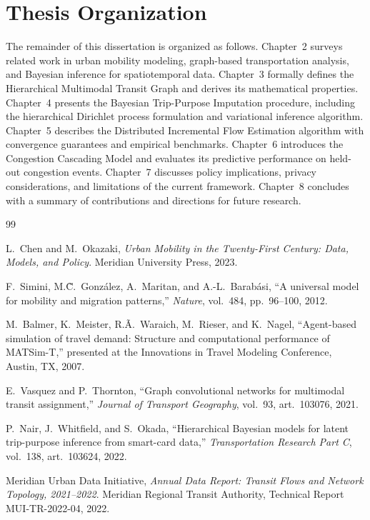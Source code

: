 \section{Thesis Organization}

The remainder of this dissertation is organized as follows. Chapter~2 surveys related work in urban mobility modeling, graph-based transportation analysis, and Bayesian inference for spatiotemporal data. Chapter~3 formally defines the Hierarchical Multimodal Transit Graph and derives its mathematical properties. Chapter~4 presents the Bayesian Trip-Purpose Imputation procedure, including the hierarchical Dirichlet process formulation and variational inference algorithm. Chapter~5 describes the Distributed Incremental Flow Estimation algorithm with convergence guarantees and empirical benchmarks. Chapter~6 introduces the Congestion Cascading Model and evaluates its predictive performance on held-out congestion events. Chapter~7 discusses policy implications, privacy considerations, and limitations of the current framework. Chapter~8 concludes with a summary of contributions and directions for future research.

\begin{thebibliography}{99}

L.\ Chen and M.\ Okazaki,
\emph{Urban Mobility in the Twenty-First Century: Data, Models, and Policy}.
Meridian University Press, 2023.

F.\ Simini, M.\~C.\ Gonz\'{a}lez, A.\ Maritan, and A.-L.\ Barab\'{a}si,
``A universal model for mobility and migration patterns,''
\emph{Nature}, vol.\ 484, pp.\ 96--100, 2012.

M.\ Balmer, K.\ Meister, R.\~A.\ Waraich, M.\ Rieser, and K.\ Nagel,
``Agent-based simulation of travel demand: Structure and computational performance of MATSim-T,''
presented at the Innovations in Travel Modeling Conference, Austin, TX, 2007.

E.\ Vasquez and P.\ Thornton,
``Graph convolutional networks for multimodal transit assignment,''
\emph{Journal of Transport Geography}, vol.\ 93, art.\ 103076, 2021.

P.\ Nair, J.\ Whitfield, and S.\ Okada,
``Hierarchical Bayesian models for latent trip-purpose inference from smart-card data,''
\emph{Transportation Research Part C}, vol.\ 138, art.\ 103624, 2022.

Meridian Urban Data Initiative,
\emph{Annual Data Report: Transit Flows and Network Topology, 2021--2022}.
Meridian Regional Transit Authority, Technical Report MUI-TR-2022-04, 2022.

\end{thebibliography}
